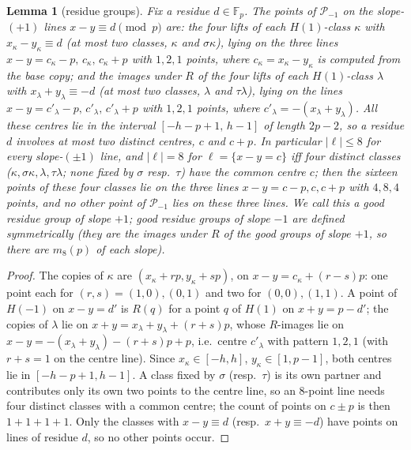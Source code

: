 \documentclass[11pt]{article}
\newtheorem{lemma}[theorem]{Lemma}
\theoremstyle{remark}
\newcommand{\Fp}{\mathbb{F}_p}
\newcommand{\Pset}{\mathcal{P}}
\begin{document}
\begin{lemma}[residue groups]\label{lem:groups}
Fix a residue $d\in\Fp$.  The points of $\Pset_{-1}$ on the slope-$(+1)$ lines $x-y\equiv d\pmod p$ are: the four lifts of each $H(1)$-class
$\kappa$ with $x_\kappa-y_\kappa\equiv d$ (at most two classes, $\kappa$ and $\sigma\kappa$), lying on the three lines $x-y=c_\kappa-p,\,c_\kappa,\,c_\kappa+p$
with $1,2,1$ points, where $c_\kappa=x_\kappa-y_\kappa$ is computed from the base copy; and the images under $R$ of the four lifts of each
$H(1)$-class $\lambda$ with $x_\lambda+y_\lambda\equiv-d$ (at most two classes, $\lambda$ and $\tau\lambda$), lying on the lines
$x-y=c'_\lambda-p,\,c'_\lambda,\,c'_\lambda+p$ with $1,2,1$ points, where $c'_\lambda=-(x_\lambda+y_\lambda)$.  All these centres lie in the
interval $[-h-p+1,\,h-1]$ of length $2p-2$, so a residue $d$ involves at most two distinct centres, $c$ and $c+p$.  In particular
$|\ell|\le8$ for every slope-$(\pm1)$ line, and $|\ell|=8$ for $\ell=\{x-y=c\}$ iff four distinct classes ($\kappa,\sigma\kappa,\lambda,\tau\lambda$;
none fixed by $\sigma$ resp.\ $\tau$) have the common centre $c$; then the sixteen points of these four classes lie on the three lines
$x-y=c-p,c,c+p$ with $4,8,4$ points, and no other point of $\Pset_{-1}$ lies on these three lines.  We call this a \emph{good residue group}
of slope $+1$; good residue groups of slope $-1$ are defined symmetrically (they are the images under $R$ of the good groups of slope
$+1$, so there are $m_8(p)$ of each slope).
\end{lemma}
\begin{proof}
The copies of $\kappa$ are $(x_\kappa+rp,y_\kappa+sp)$, on $x-y=c_\kappa+(r-s)p$: one point each for $(r,s)=(1,0),(0,1)$ and two for
$(0,0),(1,1)$.  A point of $H(-1)$ on $x-y=d'$ is $R(q)$ for a point $q$ of $H(1)$ on $x+y=p-d'$; the copies of $\lambda$ lie on
$x+y=x_\lambda+y_\lambda+(r+s)p$, whose $R$-images lie on $x-y=-(x_\lambda+y_\lambda)-(r+s)p+p$, i.e.\ centre $c'_\lambda$ with pattern $1,2,1$
(with $r+s=1$ on the centre line).  Since $x_\kappa\in[-h,h]$, $y_\kappa\in[1,p-1]$, both centres lie in $[-h-p+1,h-1]$.  A class fixed
by $\sigma$ (resp.\ $\tau$) is its own partner and contributes only its own two points to the centre line, so an $8$-point line needs four
distinct classes with a common centre; the count of points on $c\pm p$ is then $1+1+1+1$.  Only the classes with $x-y\equiv d$
(resp.\ $x+y\equiv-d$) have points on lines of residue $d$, so no other points occur.
\end{proof}
\end{document}
